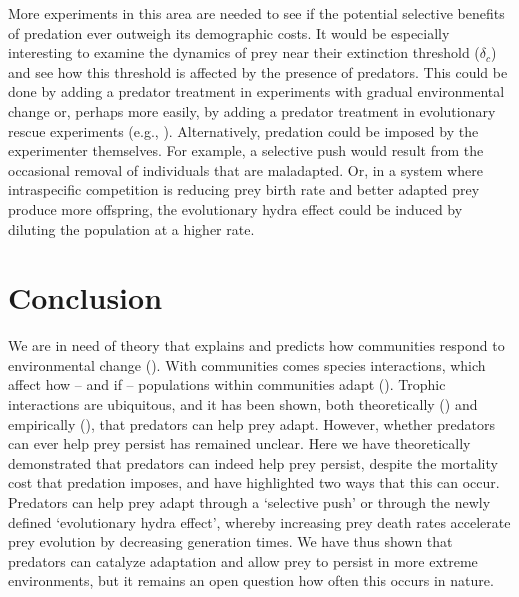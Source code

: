 \documentclass[11pt]{article}
\begin{document}
More experiments in this area are needed to see if the potential selective benefits of predation ever outweigh its demographic costs.
It would be especially interesting to examine the dynamics of prey near their extinction threshold ($\delta_c$) and see how this threshold is affected by the presence of predators. 
This could be done by adding a predator treatment in experiments with gradual environmental change \citep[e.g.,][]{Willi2009} or, perhaps more easily, by adding a predator treatment in evolutionary rescue experiments (e.g., \citealt{Bell2009e}).
Alternatively, predation could be imposed by the experimenter themselves.
For example, a selective push would result from the occasional removal of individuals that are maladapted.
Or, in a system where intraspecific competition is reducing prey birth rate and better adapted prey produce more offspring, the evolutionary hydra effect could be induced by diluting the population at a higher rate.


\section*{Conclusion}

We are in need of theory that explains and predicts how communities respond to environmental change (\citealt{LowDecarie2015}).
With communities comes species interactions, which affect how -- and if -- populations within communities adapt (\citealt{Lavergne2010}).
Trophic interactions are ubiquitous, and it has been shown, both theoretically (\citealt{Jones2008,Northfield2013,Mellard2015}) and empirically (\citealt{Tseng2015}), that predators can help prey adapt.
However, whether predators can ever help prey persist has remained unclear.
Here we have theoretically demonstrated that predators can indeed help prey persist, despite the mortality cost that predation imposes, and have highlighted two ways that this can occur.
Predators can help prey adapt through a `selective push' or through the newly defined `evolutionary hydra effect', whereby increasing prey death rates accelerate prey evolution by decreasing generation times. 
We have thus shown that predators can catalyze adaptation and allow prey to persist in more extreme environments, but it remains an open question how often this occurs in nature.

\end{document}
